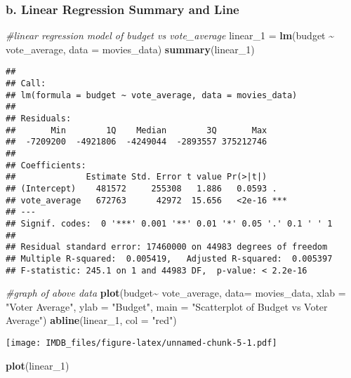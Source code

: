 \documentclass[
]{article}
\newenvironment{Shaded}{\begin{snugshade}}{\end{snugshade}}
\newcommand{\AttributeTok}[1]{\textcolor[rgb]{0.13,0.29,0.53}{#1}}
\newcommand{\CommentTok}[1]{\textcolor[rgb]{0.56,0.35,0.01}{\textit{#1}}}
\newcommand{\FunctionTok}[1]{\textcolor[rgb]{0.13,0.29,0.53}{\textbf{#1}}}
\newcommand{\NormalTok}[1]{#1}
\newcommand{\OtherTok}[1]{\textcolor[rgb]{0.56,0.35,0.01}{#1}}
\newcommand{\SpecialCharTok}[1]{\textcolor[rgb]{0.81,0.36,0.00}{\textbf{#1}}}
\newcommand{\StringTok}[1]{\textcolor[rgb]{0.31,0.60,0.02}{#1}}
\begin{document}
\hypertarget{b.-linear-regression-summary-and-line}{%
\subsubsection{b. Linear Regression Summary and
Line}\label{b.-linear-regression-summary-and-line}}

\begin{Shaded}
\begin{Highlighting}[]
\CommentTok{\#linear regression model of budget vs vote\_average}
\NormalTok{linear\_1 }\OtherTok{=} \FunctionTok{lm}\NormalTok{(budget }\SpecialCharTok{\textasciitilde{}}\NormalTok{ vote\_average, }\AttributeTok{data =}\NormalTok{ movies\_data)}
\FunctionTok{summary}\NormalTok{(linear\_1)}
\end{Highlighting}
\end{Shaded}

\begin{verbatim}
## 
## Call:
## lm(formula = budget ~ vote_average, data = movies_data)
## 
## Residuals:
##       Min        1Q    Median        3Q       Max 
##  -7209200  -4921806  -4249044  -2893557 375212746 
## 
## Coefficients:
##              Estimate Std. Error t value Pr(>|t|)    
## (Intercept)    481572     255308   1.886   0.0593 .  
## vote_average   672763      42972  15.656   <2e-16 ***
## ---
## Signif. codes:  0 '***' 0.001 '**' 0.01 '*' 0.05 '.' 0.1 ' ' 1
## 
## Residual standard error: 17460000 on 44983 degrees of freedom
## Multiple R-squared:  0.005419,   Adjusted R-squared:  0.005397 
## F-statistic: 245.1 on 1 and 44983 DF,  p-value: < 2.2e-16
\end{verbatim}

\begin{Shaded}
\begin{Highlighting}[]
\CommentTok{\#graph of above data}
\FunctionTok{plot}\NormalTok{(budget}\SpecialCharTok{\textasciitilde{}}\NormalTok{ vote\_average, }\AttributeTok{data=}\NormalTok{ movies\_data, }\AttributeTok{xlab =} \StringTok{"Voter Average"}\NormalTok{, }\AttributeTok{ylab =} \StringTok{"Budget"}\NormalTok{, }\AttributeTok{main =} \StringTok{"Scatterplot of Budget vs Voter Average"}\NormalTok{)}
\FunctionTok{abline}\NormalTok{(linear\_1, }\AttributeTok{col =} \StringTok{"red"}\NormalTok{)}
\end{Highlighting}
\end{Shaded}

\texttt{[image: IMDB\_files/figure-latex/unnamed-chunk-5-1.pdf]}

\begin{Shaded}
\begin{Highlighting}[]
\FunctionTok{plot}\NormalTok{(linear\_1)}
\end{Highlighting}
\end{Shaded}
\end{document}
